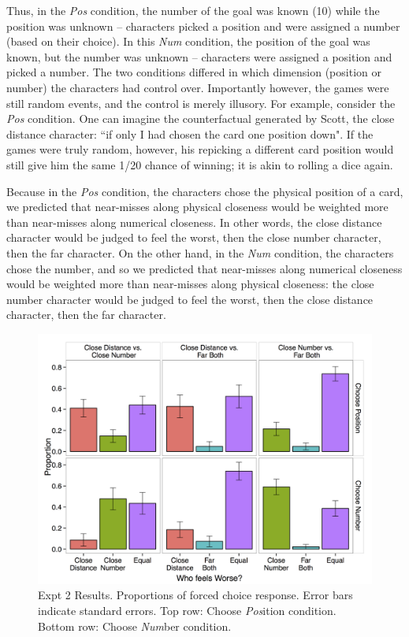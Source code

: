 \documentclass[10pt,letterpaper]{article}
\begin{document}
Thus, in the \textit{Pos} condition, the number of the goal was known (10) while the position was unknown -- characters picked a position and were assigned a number (based on their choice). In this \textit{Num} condition, the position of the goal was known, but the number was unknown -- characters were assigned a position and picked a number. The two conditions differed in which dimension (position or number) the characters had control over. Importantly however, the games were still random events, and the control is merely illusory. For example, consider the \textit{Pos} condition. One can imagine the counterfactual generated by Scott, the close distance character: ``if only I had chosen the card one position down". If the games were truly random, however, his repicking a different card position would still give him the same 1/20 chance of winning; it is akin to rolling a dice again.

Because in the \textit{Pos} condition, the characters chose the physical position of a card, we predicted that near-misses along physical closeness would be weighted more than near-misses along numerical closeness. In other words, the close distance character would be judged to feel the worst, then the close number character, then the far character. On the other hand, in the \textit{Num} condition, the characters chose the number, and so we predicted that near-misses along numerical closeness would be weighted more than near-misses along physical closeness: the close number character would be judged to feel the worst, then the close distance character, then the far character.



\begin{figure}[htb!]
\includegraphics[width=\columnwidth]{images/cardCombined_forcedWorse.png}
\caption{ Expt 2 Results. Proportions of forced choice response. Error bars indicate standard errors. Top row: Choose \textit{Pos}ition condition. Bottom row: Choose \textit{Num}ber condition.}
\label{Expt2ResultFig}
\end{figure}
\end{document}
